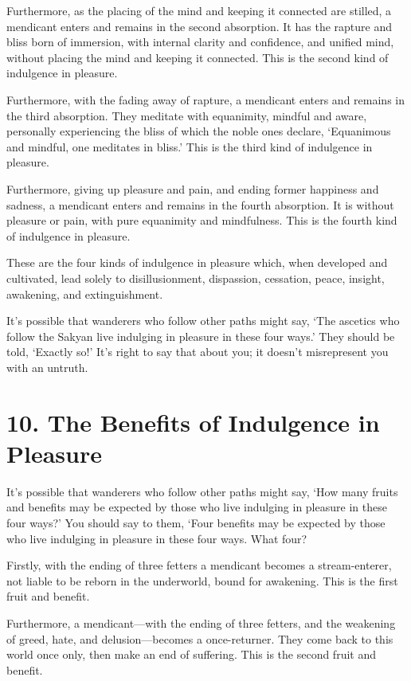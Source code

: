 \documentclass[12pt,openany]{book}%
\begin{document}
Furthermore, as the placing of the mind and keeping it connected are stilled, a mendicant enters and remains in the second absorption. It has the rapture and bliss born of immersion, with internal clarity and confidence, and unified mind, without placing the mind and keeping it connected. This is the second kind of indulgence in pleasure. 

Furthermore, with the fading away of rapture, a mendicant enters and remains in the third absorption. They meditate with equanimity, mindful and aware, personally experiencing the bliss of which the noble ones declare, ‘Equanimous and mindful, one meditates in bliss.’ This is the third kind of indulgence in pleasure. 

Furthermore, giving up pleasure and pain, and ending former happiness and sadness, a mendicant enters and remains in the fourth absorption. It is without pleasure or pain, with pure equanimity and mindfulness. This is the fourth kind of indulgence in pleasure. 

These are the four kinds of indulgence in pleasure which, when developed and cultivated, lead solely to disillusionment, dispassion, cessation, peace, insight, awakening, and extinguishment. 

It’s possible that wanderers who follow other paths might say, ‘The ascetics who follow the Sakyan live indulging in pleasure in these four ways.’ They should be told, ‘Exactly so!’ It’s right to say that about you; it doesn’t misrepresent you with an untruth. 

\section*{10. The Benefits of Indulgence in Pleasure }

It’s possible that wanderers who follow other paths might say, ‘How many fruits and benefits may be expected by those who live indulging in pleasure in these four ways?’ You should say to them, ‘Four benefits may be expected by those who live indulging in pleasure in these four ways. What four? 

Firstly, with the ending of three fetters a mendicant becomes a stream-enterer, not liable to be reborn in the underworld, bound for awakening. This is the first fruit and benefit. 

Furthermore, a mendicant—with the ending of three fetters, and the weakening of greed, hate, and delusion—becomes a once-returner. They come back to this world once only, then make an end of suffering. This is the second fruit and benefit. 
\end{document}
